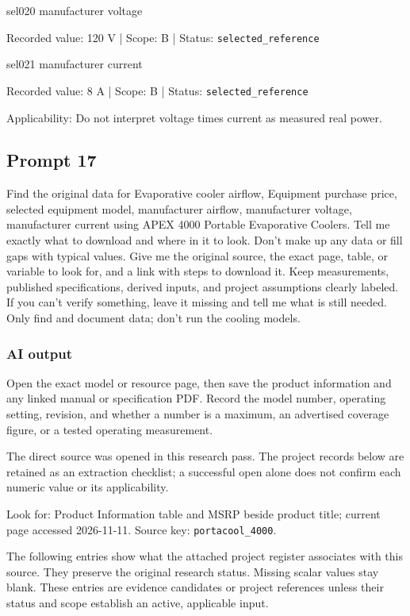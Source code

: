 sel020  manufacturer voltage

Recorded value: 120 V | Scope: B | Status: \nolinkurl{selected_reference}

sel021  manufacturer current

Recorded value: 8 A | Scope: B | Status: \nolinkurl{selected_reference}

Applicability: Do not interpret voltage times current as measured real power.

\subsection*{Prompt 17}
Find the original data for Evaporative cooler airflow, Equipment purchase price, selected equipment model, manufacturer airflow, manufacturer voltage, manufacturer current using APEX 4000 Portable Evaporative Coolers. Tell me exactly what to download and where in it to look. Don’t make up any data or fill gaps with typical values. Give me the original source, the exact page, table, or variable to look for, and a link with steps to download it. Keep measurements, published specifications, derived inputs, and project assumptions clearly labeled. If you can’t verify something, leave it missing and tell me what is still needed. Only find and document data; don’t run the cooling models.

\subsubsection*{AI output}
Open the exact model or resource page, then save the product information and any linked manual or specification PDF. Record the model number, operating setting, revision, and whether a number is a maximum, an advertised coverage figure, or a tested operating measurement.

The direct source was opened in this research pass. The project records below are retained as an extraction checklist; a successful open alone does not confirm each numeric value or its applicability.

Look for: Product Information table and MSRP beside product title; current page accessed 2026-11-11. Source key: \nolinkurl{portacool_4000}.

The following entries show what the attached project register associates with this source. They preserve the original research status. Missing scalar values stay blank. These entries are evidence candidates or project references unless their status and scope establish an active, applicable input.


